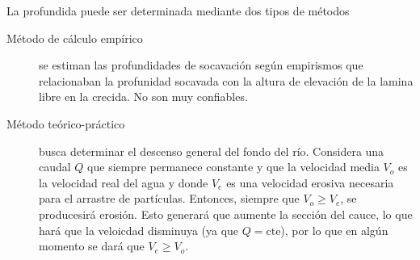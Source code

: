 \documentclass[../main.tex]{subfiles}
\begin{document}
La profundida puede ser determinada mediante dos tipos de métodos

\begin{description}
  \item[Método de cálculo empírico] se estiman las profundidades de socavación
    según empirismos que relacionaban la profunidad socavada con la altura de
    elevación de la lamina libre en la crecida. No son muy confiables.

  \item[Método teórico-práctico] busca determinar el descenso general del fondo
    del río. Considera una caudal $Q$ que siempre permanece constante y que la 
    velocidad media $V_o$ es la velocidad real del agua y donde $V_e$ es una 
    velocidad erosiva necesaria para el arrastre de partículas. Entonces, siempre
    que $V_o \geq V_e$, se producesirá erosión. Esto generará que aumente la
    sección del cauce, lo que hará que la veloicdad disminuya (ya que $Q=\text{cte}$),
    por lo que en algún momento se dará que $V_e \geq V_o$.


\end{description}
\end{document}
